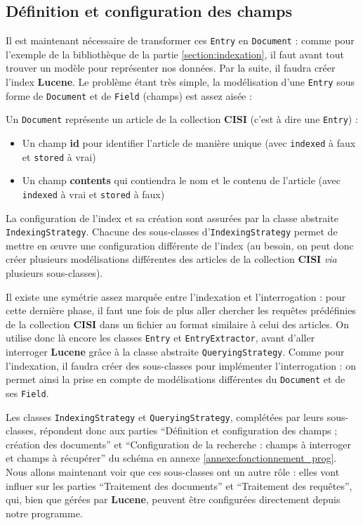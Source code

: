 \subsection{Définition et configuration des champs}

Il est maintenant nécessaire de transformer ces \texttt{Entry} en \texttt{Document} : comme pour l’exemple de la bibliothèque de la partie \ref{section:indexation}, il faut avant tout trouver un modèle pour représenter nos données. Par la suite, il faudra créer l’index \textbf{Lucene}.
Le problème étant très simple, la modélisation d’une \texttt{Entry} sous forme de \texttt{Document} et de \texttt{Field} (champs) est assez aisée :

Un \texttt{Document} représente un article de la collection \textbf{CISI} (c’est à dire une \texttt{Entry}) :
\begin{itemize}
\item Un champ \textbf{id} pour identifier l’article de manière unique (avec \texttt{indexed} à faux et \texttt{stored} à vrai)
\item Un champ \textbf{contents} qui contiendra le nom et le contenu de l’article (avec \texttt{indexed} à vrai et \texttt{stored} à faux)\\
\end{itemize}

La configuration de l’index et sa création sont assurées par la classe abstraite \texttt{IndexingStrategy}. Chacune des sous-classes d’\texttt{IndexingStrategy} permet de mettre en œuvre une configuration différente de l’index (au besoin, on peut donc créer plusieurs modélisations différentes des articles de la collection \textbf{CISI} \textit{via} plusieurs sous-classes).

Il existe une symétrie assez marquée entre l’indexation et l’interrogation : pour cette dernière phase, il faut une fois de plus aller chercher les requêtes prédéfinies de la collection \textbf{CISI} dans un fichier au format similaire à celui des articles. On utilise donc là encore les classes \texttt{Entry} et \texttt{EntryExtractor}, avant d’aller interroger \textbf{Lucene} grâce à la classe abstraite \texttt{QueryingStrategy}. Comme pour l’indexation, il faudra créer des sous-classes pour implémenter l’interrogation : on permet ainsi la prise en compte de modélisations différentes du \texttt{Document} et de ses \texttt{Field}.

Les classes \texttt{IndexingStrategy} et \texttt{QueryingStrategy}, complétées par leurs sous-classes, répondent donc aux parties “Définition et configuration des champs ; création des documents” et “Configuration de la recherche : champs à interroger et champs à récupérer” du schéma en annexe \ref{annexe:fonctionnement_prog}. Nous allons maintenant voir que ces sous-classes ont un autre rôle : elles vont influer sur les parties “Traitement des documents” et “Traitement des requêtes”, qui, bien que gérées par \textbf{Lucene}, peuvent être configurées directement depuis notre programme.


